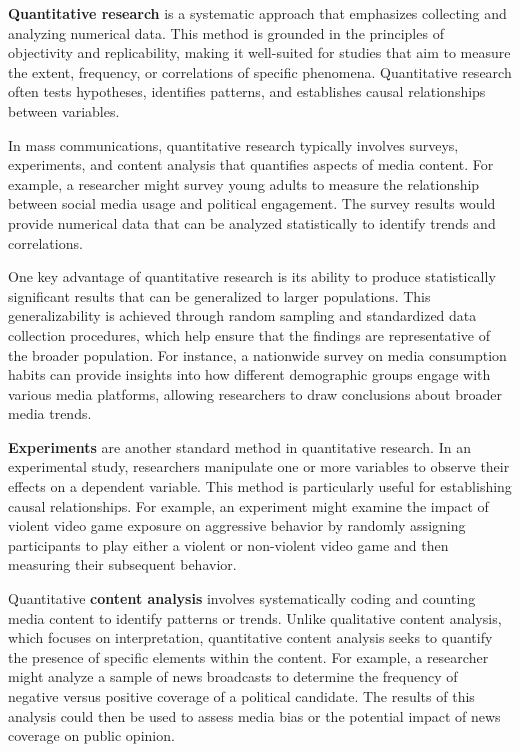 \documentclass[
]{book}
\begin{document}
\textbf{Quantitative research} is a systematic approach that emphasizes collecting and analyzing numerical data. This method is grounded in the principles of objectivity and replicability, making it well-suited for studies that aim to measure the extent, frequency, or correlations of specific phenomena. Quantitative research often tests hypotheses, identifies patterns, and establishes causal relationships between variables.

In mass communications, quantitative research typically involves surveys, experiments, and content analysis that quantifies aspects of media content. For example, a researcher might survey young adults to measure the relationship between social media usage and political engagement. The survey results would provide numerical data that can be analyzed statistically to identify trends and correlations.

One key advantage of quantitative research is its ability to produce statistically significant results that can be generalized to larger populations. This generalizability is achieved through random sampling and standardized data collection procedures, which help ensure that the findings are representative of the broader population. For instance, a nationwide survey on media consumption habits can provide insights into how different demographic groups engage with various media platforms, allowing researchers to draw conclusions about broader media trends.

\textbf{Experiments} are another standard method in quantitative research. In an experimental study, researchers manipulate one or more variables to observe their effects on a dependent variable. This method is particularly useful for establishing causal relationships. For example, an experiment might examine the impact of violent video game exposure on aggressive behavior by randomly assigning participants to play either a violent or non-violent video game and then measuring their subsequent behavior.

Quantitative \textbf{content analysis} involves systematically coding and counting media content to identify patterns or trends. Unlike qualitative content analysis, which focuses on interpretation, quantitative content analysis seeks to quantify the presence of specific elements within the content. For example, a researcher might analyze a sample of news broadcasts to determine the frequency of negative versus positive coverage of a political candidate. The results of this analysis could then be used to assess media bias or the potential impact of news coverage on public opinion.
\end{document}
